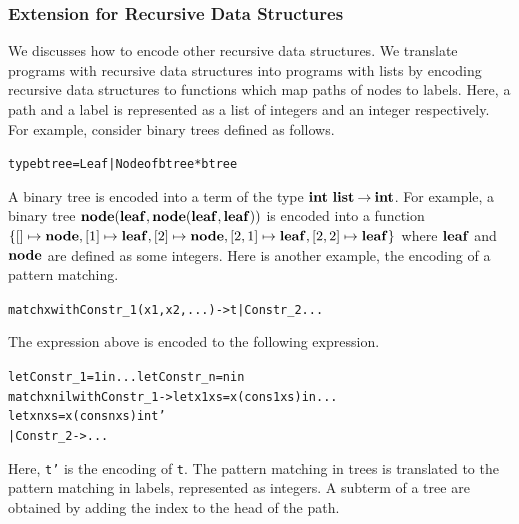 


\subsubsection{Extension for Recursive Data Structures}
We discusses how to encode other recursive data structures.  We
translate programs with recursive data structures into programs with
lists by encoding recursive data structures to functions which map paths
of nodes to labels.  Here, a path and a label is represented as a list
of integers and an integer respectively.  For example, consider binary trees defined
as follows.
\begin{alltt}
type btree = Leaf | Node of btree * btree
\end{alltt}
A binary tree is encoded into a term of the type
${{\mathbf{int}}\ \mathbf{list}}\mathbin{\rightarrow}{\mathbf{int}}$.  For example, a binary tree
$\mathbf{node}({\mathbf{leaf}},{\mathbf{node}({\mathbf{leaf}},{\mathbf{leaf}})})$ is encoded into a function $\{[]
\mapsto \mathbf{node}, [1] \mapsto \mathbf{leaf}, [2] \mapsto \mathbf{node}, [2,1] \mapsto
\mathbf{leaf}, [2,2] \mapsto \mathbf{leaf}\}$ where $\mathbf{leaf}$ and $\mathbf{node}$ are defined as
some integers.
Here is another example, the encoding of a pattern matching.
\begin{alltt}
match x with Constr_1(x1, x2, ...) -> t | Constr_2 ...
\end{alltt}
The expression above is encoded to the following expression.
\begin{alltt}
let Constr_1 = 1 in ... let Constr_n = n in
  match x nil with Constr_1 -> let x1 xs = x (cons 1 xs) in ...
                               let xn xs = x (cons n xs) in t'
                 | Constr_2 -> ...
\end{alltt}
Here, \texttt{t'} is the encoding of \texttt{t}. The pattern matching in
trees is translated to the pattern matching in labels, represented as
integers.  A subterm of a tree are obtained by adding the index to the head of the path.

